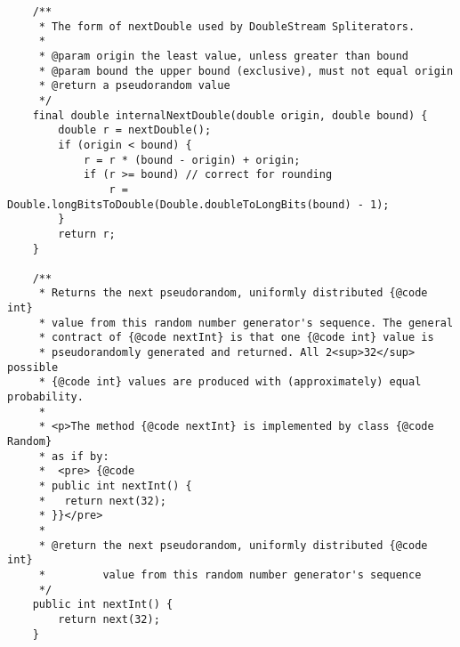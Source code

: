 \documentclass[12pt,a4paper,twoside,openright,titlepage,final]{article}
\begin{document}
\begin{verbatim}
    /**
     * The form of nextDouble used by DoubleStream Spliterators.
     *
     * @param origin the least value, unless greater than bound
     * @param bound the upper bound (exclusive), must not equal origin
     * @return a pseudorandom value
     */
    final double internalNextDouble(double origin, double bound) {
        double r = nextDouble();
        if (origin < bound) {
            r = r * (bound - origin) + origin;
            if (r >= bound) // correct for rounding
                r = Double.longBitsToDouble(Double.doubleToLongBits(bound) - 1);
        }
        return r;
    }

    /**
     * Returns the next pseudorandom, uniformly distributed {@code int}
     * value from this random number generator's sequence. The general
     * contract of {@code nextInt} is that one {@code int} value is
     * pseudorandomly generated and returned. All 2<sup>32</sup> possible
     * {@code int} values are produced with (approximately) equal probability.
     *
     * <p>The method {@code nextInt} is implemented by class {@code Random}
     * as if by:
     *  <pre> {@code
     * public int nextInt() {
     *   return next(32);
     * }}</pre>
     *
     * @return the next pseudorandom, uniformly distributed {@code int}
     *         value from this random number generator's sequence
     */
    public int nextInt() {
        return next(32);
    }


\end{verbatim}
\end{document}
